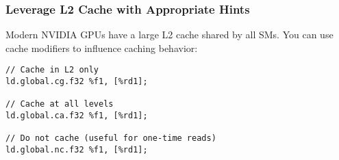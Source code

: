 \subsubsection{Leverage L2 Cache with Appropriate Hints}

Modern NVIDIA GPUs have a large L2 cache shared by all SMs. You can use cache modifiers to influence caching behavior:

\begin{lstlisting}[style=ptx]
// Cache in L2 only
ld.global.cg.f32 %f1, [%rd1];

// Cache at all levels
ld.global.ca.f32 %f1, [%rd1];

// Do not cache (useful for one-time reads)
ld.global.nc.f32 %f1, [%rd1];
\end{lstlisting}

